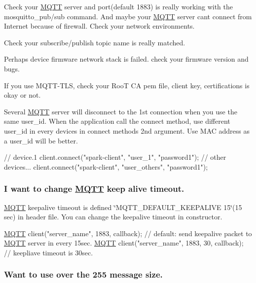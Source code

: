 \begin{DoxyItemize}
\item Check your \hyperlink{class_m_q_t_t}{M\+Q\+TT} server and port(default 1883) is really working with the mosquitto\+\_\+pub/sub command. And maybe your \hyperlink{class_m_q_t_t}{M\+Q\+TT} server can\textquotesingle{}t connect from Internet because of firewall. Check your network environments.
\item Check your subscribe/publish topic name is really matched.
\item Perhaps device firmware network stack is failed. check your firmware version and bugs.
\item If you use M\+Q\+T\+T-\/\+T\+LS, check your RooT CA pem file, client key, certifications is okay or not.
\item Several \hyperlink{class_m_q_t_t}{M\+Q\+TT} server will disconnect to the 1st connection when you use the same user\+\_\+id. When the application call the connect method, use different user\+\_\+id in every devices in connect method\textquotesingle{}s 2nd argument. Use M\+AC address as a user\+\_\+id will be better. 
\begin{DoxyPre}
   // device.1
   client.connect("spark-client", "user\_1", "password1");
   // other devices...
   client.connect("spark-client", "user\_others", "password1");
\end{DoxyPre}

\end{DoxyItemize}

\subsubsection*{I want to change \hyperlink{class_m_q_t_t}{M\+Q\+TT} keep alive timeout.}

\hyperlink{class_m_q_t_t}{M\+Q\+TT} keepalive timeout is defined \char`\"{}\+M\+Q\+T\+T\+\_\+\+D\+E\+F\+A\+U\+L\+T\+\_\+\+K\+E\+E\+P\+A\+L\+I\+V\+E 15\char`\"{}(15 sec) in header file. You can change the keepalive timeout in constructor. 
\begin{DoxyPre}
    \hyperlink{class_m_q_t_t}{MQTT} client("server\_name", 1883, callback); // default: send keepalive packet to \hyperlink{class_m_q_t_t}{MQTT} server in every 15sec.
    \hyperlink{class_m_q_t_t}{MQTT} client("server\_name", 1883, 30, callback); // keepliave timeout is 30sec.
\end{DoxyPre}


\subsubsection*{Want to use over the 255 message size.}

